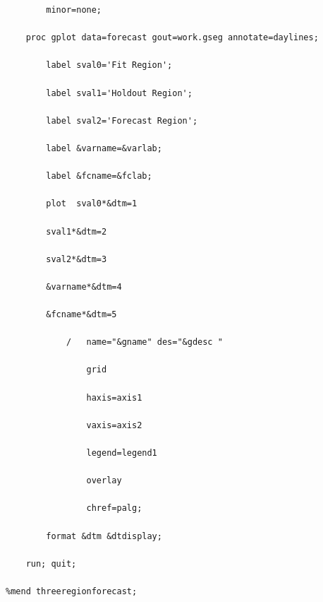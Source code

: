 \documentclass[10pt]{sugconf-ish}
\begin{document}
\begin{verbatim}
        minor=none;

    proc gplot data=forecast gout=work.gseg annotate=daylines;

        label sval0='Fit Region';

        label sval1='Holdout Region';

        label sval2='Forecast Region';

        label &varname=&varlab;

        label &fcname=&fclab;

        plot  sval0*&dtm=1 

        sval1*&dtm=2 

        sval2*&dtm=3 

        &varname*&dtm=4 

        &fcname*&dtm=5 

            /   name="&gname" des="&gdesc "

                grid

                haxis=axis1 

                vaxis=axis2 

                legend=legend1

                overlay 

                chref=palg;

        format &dtm &dtdisplay;

    run; quit;

%mend threeregionforecast;
\end{verbatim}
\end{document}
